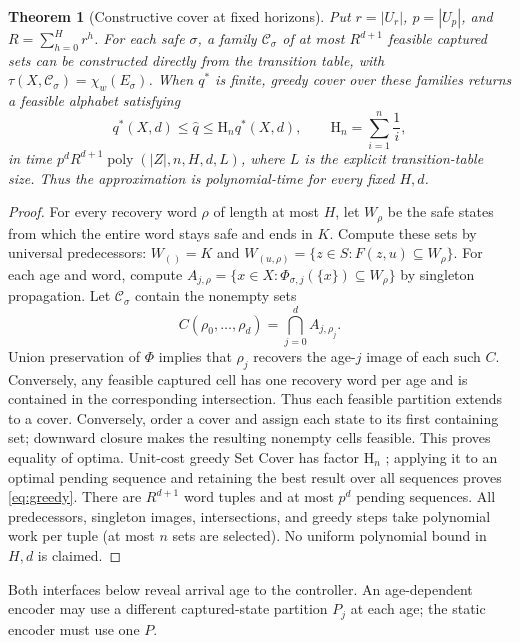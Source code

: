 \documentclass[letterpaper,10pt,conference]{ieeeconf}
\newtheorem{theorem}{Theorem}
\begin{document}
\begin{theorem}[Constructive cover at fixed horizons]\label{thm:wordcover}
Put $r=|U_r|$, $p=|U_p|$, and $R=\sum_{h=0}^H r^h$. For each safe $\sigma$, a family
$\mathcal C_\sigma$ of at most $R^{d+1}$ feasible captured sets can be constructed directly from
the transition table, with
$\tau(X,\mathcal C_\sigma)=\chi_w(E_\sigma)$.
When $q^*$ is finite, greedy cover over these families returns a feasible alphabet satisfying
\begin{equation}
 q^*(X,d)\le\widehat q\le \mathrm H_n q^*(X,d),\qquad
 \mathrm H_n=\sum_{i=1}^n\frac1i ,                          \label{eq:greedy}
\end{equation}
in time
$p^d R^{d+1}\operatorname{poly}(|Z|,n,H,d,L)$, where $L$ is the explicit transition-table size.
Thus the approximation is polynomial-time for every fixed $H,d$.
\end{theorem}
\begin{proof}
For every recovery word $\rho$ of length at most $H$, let $W_\rho$ be the safe states from which
the entire word stays safe and ends in $K$. Compute these sets by universal predecessors:
$W_{()}=K$ and
$W_{(u,\rho)}=\{z\in S:F(z,u)\subseteq W_\rho\}$.
For each age and word, compute
$A_{j,\rho}=\{x\in X:\Phi_{\sigma,j}(\{x\})\subseteq W_\rho\}$ by singleton propagation.
Let $\mathcal C_\sigma$ contain the nonempty sets
\begin{equation}
 C(\rho_0,\ldots,\rho_d)=\bigcap_{j=0}^d A_{j,\rho_j}. \label{eq:wordcover}
\end{equation}
Union preservation of $\Phi$ implies that $\rho_j$ recovers the age-$j$ image of each such $C$.
Conversely, any feasible captured cell has one recovery word per age and is contained in the
corresponding intersection. Thus each feasible partition extends to a cover. Conversely, order a
cover and assign each state to its first containing set; downward closure makes the resulting
nonempty cells feasible. This proves equality of optima. Unit-cost greedy Set Cover has factor
$\mathrm H_n$ \cite{chvatal1979}; applying it to an optimal pending sequence and retaining the
best result over all sequences proves \eqref{eq:greedy}. There are $R^{d+1}$ word tuples and at
most $p^d$ pending sequences. All predecessors, singleton images, intersections, and greedy steps
take polynomial work per tuple (at most $n$ sets are selected). No uniform polynomial bound in
$H,d$ is claimed.
\end{proof}

Both interfaces below reveal arrival age to the controller. An age-dependent encoder may use a
different captured-state partition $P_j$ at each age; the static encoder must use one $P$.
\end{document}
